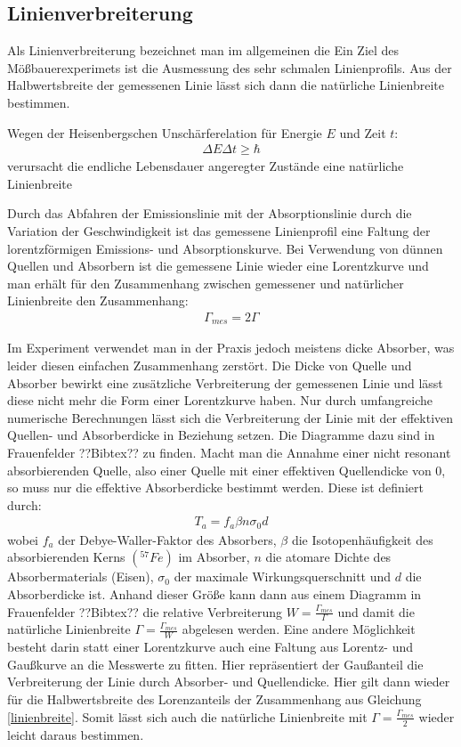 \documentclass[12pt]{article}
\begin{document}
\subsection{Linienverbreiterung}
Als Linienverbreiterung bezeichnet man im allgemeinen die 
Ein Ziel des Mößbauerexperimets ist die Ausmessung des sehr schmalen Linienprofils. Aus der Halbwertsbreite der gemessenen Linie lässt sich dann die natürliche Linienbreite bestimmen.

Wegen der Heisenbergschen Unschärferelation für Energie $E$ und Zeit $t$:
\begin{align}
 \Delta E \Delta t \geq \hbar
\end{align}
verursacht die endliche Lebensdauer angeregter Zustände eine natürliche Linienbreite

Durch das Abfahren der Emissionslinie mit der Absorptionslinie durch die Variation der Geschwindigkeit ist das gemessene Linienprofil eine Faltung der lorentzförmigen
Emissions- und Absorptionskurve. Bei Verwendung von dünnen Quellen und Absorbern ist die gemessene Linie wieder eine Lorentzkurve und man erhält für den Zusammenhang
zwischen gemessener und natürlicher Linienbreite den Zusammenhang:
\begin{align}
 \label{linienbreite}
 \Gamma_{mes} = 2\Gamma
\end{align}

Im Experiment verwendet man in der Praxis jedoch meistens dicke Absorber, was leider diesen einfachen Zusammenhang zerstört. Die Dicke von Quelle und Absorber bewirkt
eine zusätzliche Verbreiterung der gemessenen Linie und lässt diese nicht mehr die Form einer Lorentzkurve haben. Nur durch umfangreiche numerische Berechnungen
lässt sich die Verbreiterung der Linie mit der effektiven Quellen- und Absorberdicke in Beziehung setzen. Die Diagramme dazu sind in Frauenfelder ??Bibtex?? zu finden.
Macht man die Annahme einer nicht resonant absorbierenden Quelle, also einer Quelle mit einer effektiven Quellendicke von 0, so muss nur die effektive Absorberdicke bestimmt
werden. Diese ist definiert durch:
\begin{align}
 T_a = f_a \beta n \sigma_0 d
\end{align}
wobei $f_a$ der Debye-Waller-Faktor des Absorbers, $\beta$ die Isotopenhäufigkeit des absorbierenden Kerns $(^{57}Fe)$ im Absorber, $n$ die atomare Dichte
des Absorbermaterials (Eisen), $\sigma_0$ der maximale Wirkungsquerschnitt und $d$ die Absorberdicke ist. Anhand dieser Größe kann dann aus einem Diagramm in Frauenfelder ??Bibtex??
die relative Verbreiterung $W = \frac{\Gamma_{mes}}{\Gamma}$ und damit die natürliche Linienbreite $\Gamma = \frac{\Gamma_{mes}}{W}$ abgelesen werden.
Eine andere Möglichkeit besteht darin statt einer Lorentzkurve auch eine Faltung aus Lorentz- und Gaußkurve an die Messwerte zu fitten. Hier repräsentiert der Gaußanteil
die Verbreiterung der Linie durch Absorber- und Quellendicke. Hier gilt dann wieder für die Halbwertsbreite des Lorenzanteils der Zusammenhang aus Gleichung \ref{linienbreite}.
Somit lässt sich auch die natürliche Linienbreite mit $\Gamma = \frac{\Gamma_{mes}}{2}$ wieder leicht daraus bestimmen.
\end{document}
